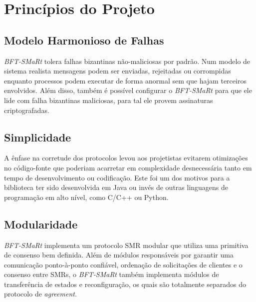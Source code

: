 	\section{Princípios do Projeto}
	
		\subsection{Modelo Harmonioso de Falhas}
		\textit{BFT-SMaRt} tolera falhas bizantinas não-maliciosas por padrão. Num modelo de sistema realista mensagens podem ser enviadas, rejeitadas ou corrompidas enquanto processos podem executar de forma anormal sem que hajam terceiros envolvidos. Além disso, também é possível configurar o \textit{BFT-SMaRt} para que ele lide com falha bizantinas maliciosas, para tal ele provem assinaturas criptografadas. \\
		
		\subsection{Simplicidade}
		A ênfase na corretude dos protocolos levou aos projetistas evitarem otimizações no código-fonte que poderiam acarretar em complexidade desnecessária tanto em tempo de desenvolvimento ou codificação. Este foi um dos motivos para a biblioteca ter sido desenvolvida em Java ou invés de outras linguagens de programação em alto nível, como C/C++ ou Python.\\
		
		\subsection{Modularidade}
		\textit{BFT-SMaRt} implementa um protocolo SMR modular que utiliza uma primitiva de consenso bem definida. Além de módulos responsáveis por garantir uma comunicação ponto-à-ponto confiável, ordenação de solicitações de clientes e o consenso entre SMRs, o \textit{BFT-SMaRt} também implementa módulos de transferência de estados e reconfiguração, os quais são totalmente separados do protocolo de \textit{agreement}.\\
		
